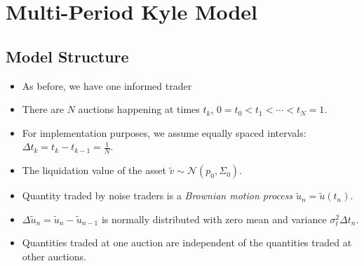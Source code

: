 \documentclass{beamer}
\begin{document}
\section{Multi-Period Kyle Model}
\subsection{Model Structure}

\begin{frame}
    \begin{itemize}
        \item As before, we have one informed trader
        \item There are $N$ auctions happening at times $t_k$, $0 = t_0 < t_1 < \cdots < t_N = 1$.
        \item For implementation purposes, we assume equally spaced intervals: $\Delta t_k = t_k - t_{k-1} = \frac{1}{N}$.
        \item The liquidation value of the asset $\tilde{v} \sim \mathcal{N}(p_0, \Sigma_0)$.
    \end{itemize}
\end{frame} 

\begin{frame}
    \begin{itemize}
        \item Quantity traded by noise traders is a \textit{Brownian motion process} $\tilde{u}_n = \tilde{u}(t_n)$.
        \item $\Delta \tilde{u}_n = \tilde{u}_n - \tilde{u}_{n-1}$ is normally distributed with zero mean and variance $\sigma^2_t\Delta t_n$.
        \item Quantities traded at one auction are independent of the quantities traded at other auctions.
    \end{itemize}
\end{frame}
\end{document}
